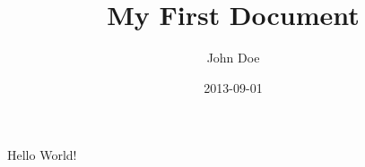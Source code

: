 \documentclass{article}
\title{My First Document}
\date{2013-09-01}
\author{John Doe}
\begin{document}
    \maketitle
    \newpage

    Hello World!
\end{document}
